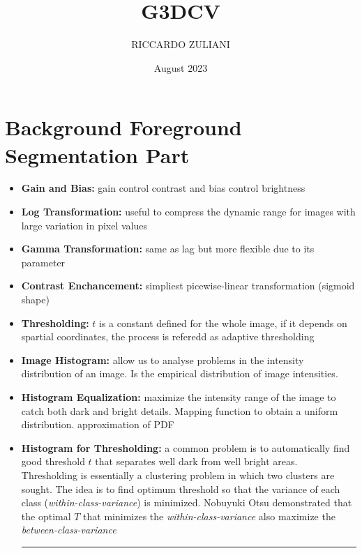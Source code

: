 \documentclass{article}
\title{G3DCV}
\author{RICCARDO ZULIANI}
\date{August 2023}
\begin{document}
\maketitle

\section{Background Foreground Segmentation Part}
\begin{itemize}
    \item \textbf{Gain and Bias:} gain control contrast and bias control brightness
    \item \textbf{Log Transformation:} useful to compress the dynamic range for images with large variation in pixel values
    \item \textbf{Gamma Transformation:} same as lag but more flexible due to its parameter
    \item \textbf{Contrast Enchancement:} simpliest picewise-linear transformation (sigmoid shape)
    \item \textbf{Thresholding:} \(t\) is a constant defined for the whole image, if it depends on spartial coordinates, the process is referedd as adaptive thresholding
    \item \textbf{Image Histogram:} allow us to analyse problems in the intensity distribution of an image. Is the empirical distribution of image intensities.
    \item \textbf{Histogram Equalization:} maximize the intensity range of the image to catch both dark and bright details. Mapping function to obtain a uniform distribution. approximation of PDF
    \item \textbf{Histogram for Thresholding:} a common problem is to automatically find good threshold \(t\) that separates well dark from well bright areas. Thresholding is essentially a clustering problem in which two clusters are sought. The idea is to find optimum threshold so that the variance of each class (\textit{within-class-variance}) is minimized. Nobuyuki Otsu demonstrated that the optimal \(T\) that minimizes the \textit{within-class-variance} also maximize the \textit{between-class-variance}

    \par\noindent\rule{\textwidth}{0.5pt}
    \par


\end{itemize}
\end{document}
